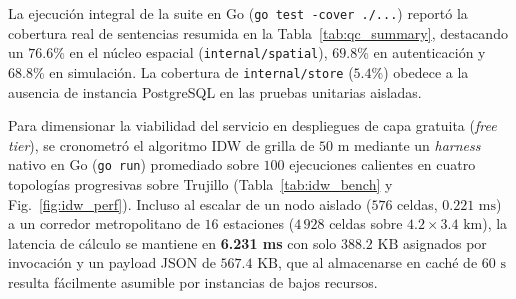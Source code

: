 \documentclass[conference]{IEEEtran}
\begin{document}
La ejecución integral de la suite en Go (\texttt{go test -cover ./...}) reportó la cobertura real de sentencias resumida en la Tabla~\ref{tab:qc_summary}, destacando un $76.6\%$ en el núcleo espacial (\texttt{internal/spatial}), $69.8\%$ en autenticación y $68.8\%$ en simulación. La cobertura de \texttt{internal/store} ($5.4\%$) obedece a la ausencia de instancia PostgreSQL en las pruebas unitarias aisladas.

Para dimensionar la viabilidad del servicio en despliegues de capa gratuita (\emph{free tier}), se cronometró el algoritmo IDW de grilla de $50\text{ m}$ mediante un \emph{harness} nativo en Go (\texttt{go run}) promediado sobre $100$ ejecuciones calientes en cuatro topologías progresivas sobre Trujillo (Tabla~\ref{tab:idw_bench} y Fig.~\ref{fig:idw_perf}). Incluso al escalar de un nodo aislado ($576$ celdas, $0.221\text{ ms}$) a un corredor metropolitano de $16$ estaciones ($4\,928$ celdas sobre $4.2 \times 3.4\text{ km}$), la latencia de cálculo se mantiene en \textbf{6.231 ms} con solo $388.2\text{ KB}$ asignados por invocación y un payload JSON de $567.4\text{ KB}$, que al almacenarse en caché de $60\text{ s}$ resulta fácilmente asumible por instancias de bajos recursos.

\begin{table}[!t]
\centering
\caption{Resumen de evidencias verificadas de hardware, firmware y backend}
\label{tab:qc_summary}
\footnotesize
{}
\end{table}
\end{document}

